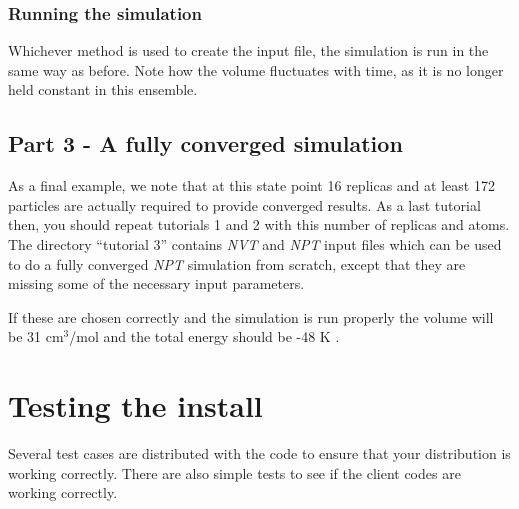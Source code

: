 \documentclass[11pt,english,fleqn]{report}
\begin{document}
\subsubsection{Running the simulation}

Whichever method is used to create the input file, the simulation
is run in the same way as before. 
Note how the volume fluctuates with time, as it is no longer held
constant in this ensemble.

\subsection{Part 3 - A fully converged simulation}

As a final example, we note that at this state point 16 replicas
and at least 172 particles are actually 
required to provide converged results.
As a last tutorial then, you should repeat tutorials 1 and 2 with
this number of replicas and atoms. The directory {}``tutorial 3'' contains 
\emph{NVT} and \emph{NPT} input files which can be used to do a fully converged
\emph{NPT} simulation from scratch, except that they are missing some
of the necessary input parameters.

If these are chosen correctly and the simulation is run properly
the volume will be 31 \(\textrm{cm}^3\)/mol and the total energy
should be -48 K \cite{mart+99jcp}.


\section{Testing the install}

\label{tests}

Several test cases are distributed with the code to ensure that your
distribution is working correctly. There are also simple tests to
see if the client codes are working correctly.
\end{document}
